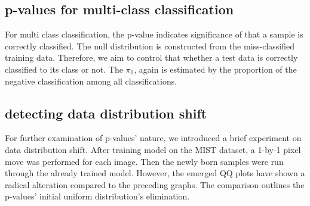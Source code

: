 \documentclass{article}
\begin{document}
\subsection{p-values for multi-class classification}

For multi class classification, the p-value indicates significance of that a sample is correctly classified. The null distribution is constructed from the miss-classified training data. Therefore, we aim to control that whether a test data is correctly classified to its class or not. The $\pi_0$, again is estimated by the proportion of the negative classification among all classifications.

\subsection{detecting data distribution shift}

For further examination of p-values’ nature, we introduced a brief experiment on data distribution shift. After training model on the MIST dataset, a 1-by-1 pixel move was performed for each image. Then the newly born samples were run through the already trained model. However, the emerged QQ plots have shown a radical alteration compared to the preceding graphs. The comparison outlines the p-values’ initial uniform distribution’s elimination. 
\end{document}
